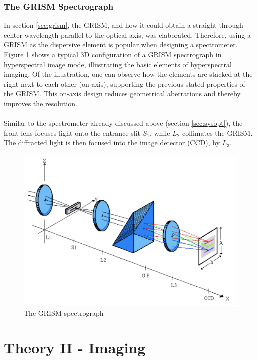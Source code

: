 \subsection{The GRISM Spectrograph}
In section \ref{sec:grism}, the GRISM, and how it could obtain a straight through center wavelength parallel to the optical axis, was elaborated. Therefore, using a GRISM as the dispersive element is popular when designing a spectrometer. Figure \ref{fig:grismspec} shows a typical 3D configuration of a GRISM spectrograph in hyperspectral image mode, illustrating the basic elements of hyperspectral imaging. Of the illustration, one can observe how the elements are stacked at the right next to each other (on axis), supporting the previous stated properties of the GRISM. This on-axis design reduces geometrical aberrations and thereby improves the resolution. 
\\\\
Similar to the spectrometer already discussed above (section \ref{sec:sysopt}), the front lens focuses light onto the entrance slit $S_1$, while $L_2$ collimates the GRISM. The diffracted light is then focused into the image detector (CCD), by $L_3$. 

\begin{figure}[H]
    \centering
    \includegraphics[width = 12cm]{Images/theory/grismspec.png}
    \caption{The GRISM spectrograph}
    \label{fig:grismspec}
\end{figure}


\chapter{Theory II - Imaging}
\label{chap:theory2}


